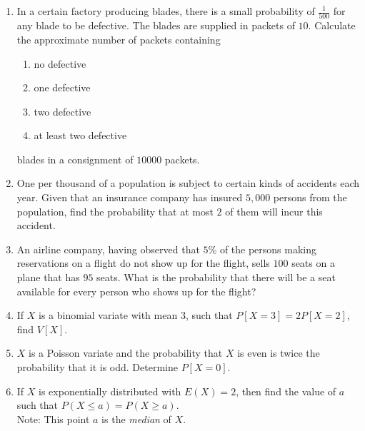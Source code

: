 \documentclass[svgnames]{amsart}
\begin{document}
\begin{enumerate}[leftmargin=*]
\item In a certain factory producing blades, there is a small probability of $\frac{1}{500}$ for any blade to be defective. The blades are supplied in packets of $10$. Calculate the approximate number of packets containing
\begin{enumerate}[label=(\roman*)]
	\item no defective
	\item one defective
	\item two defective
	\item at least two defective
\end{enumerate}
blades in a consignment of $10000$ packets.

\item One per thousand of a population is subject to certain kinds of accidents each year. Given that an insurance company has insured $5,000$ persons from the population, find the probability that at most $2$ of them will incur this accident.

\item An airline company, having observed that $5\%$ of the persons making reservations on a flight do not show up for the flight, sells $100$ seats on a plane that has $95$ seats. What is the probability that there will be a seat available for every person who shows up for the flight?

\item If $X$ is a binomial variate with mean $3$, such that $P[X = 3] = 2P[X = 2]$, find $V[X]$.

\item $X$ is a Poisson variate and the probability that $X$ is even is twice the probability that it is odd. Determine $P[X = 0]$.

\item  If $X$ is exponentially distributed with $E(X) = 2$, then find the value of $a$ such that $P(X \le a) = P(X \ge a)$.\\
{\small\color{blue!40!black}
		Note: This point $a$ is the \emph{median} of $X$.
}
 

\end{enumerate}
\end{document}

